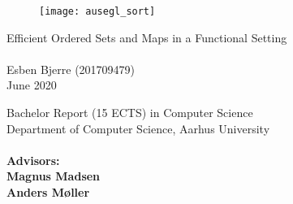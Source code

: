 \documentclass[main.tex]{subfiles}
\begin{document}

\begin{figure}[H]
\centering
\texttt{[image: ausegl\_sort]}
\end{figure}

\vspace{8.75mm}

\begin{center}
\normalfont\Large
Efficient Ordered Sets and Maps in a Functional Setting
\\~\\
\normalfont\large
Esben Bjerre (201709479)\\
June 2020

\vspace{8.75mm}

\normalfont\normalsize
Bachelor Report (15 ECTS) in Computer Science\\
Department of Computer Science, Aarhus University
\\~\\
\normalfont\bfseries
Advisors:\\
\normalfont\normalsize
Magnus Madsen\\
Anders Møller

\end{center}

\restoregeometry
\end{document}
